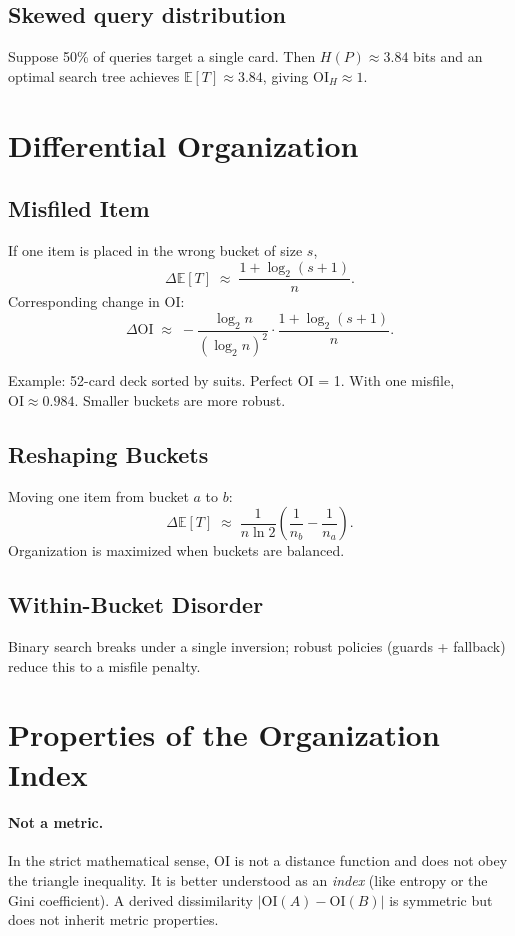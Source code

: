 \documentclass[11pt]{article}
\begin{document}
\subsection{Skewed query distribution}
Suppose 50\% of queries target a single card. Then
$H(P)\approx 3.84$ bits and an optimal search tree achieves
$\mathbb{E}[T]\approx 3.84$, giving $\mathrm{OI}_H\approx 1$.

\section{Differential Organization}
\subsection{Misfiled Item}
If one item is placed in the wrong bucket of size $s$,
\[
\Delta \mathbb{E}[T] \;\approx\; \frac{1+\log_2(s+1)}{n}.
\]
Corresponding change in OI:
\[
\Delta \mathrm{OI} \;\approx\;
-\frac{\log_2 n}{(\log_2 n)^2}\cdot \frac{1+\log_2(s+1)}{n}.
\]

Example: 52-card deck sorted by suits. Perfect OI = 1. With one misfile,
$\mathrm{OI} \approx 0.984$. Smaller buckets are more robust.

\subsection{Reshaping Buckets}
Moving one item from bucket $a$ to $b$:
\[
\Delta \mathbb{E}[T] \;\approx\; \frac{1}{n\ln 2}
\left(\frac{1}{n_b} - \frac{1}{n_a}\right).
\]
Organization is maximized when buckets are balanced.

\subsection{Within-Bucket Disorder}
Binary search breaks under a single inversion; robust policies (guards +
fallback) reduce this to a misfile penalty.

\section{Properties of the Organization Index}
\paragraph{Not a metric.}
In the strict mathematical sense, $\mathrm{OI}$ is not a distance function and
does not obey the triangle inequality. It is better understood as an \emph{index}
(like entropy or the Gini coefficient). A derived dissimilarity
$|\mathrm{OI}(A)-\mathrm{OI}(B)|$ is symmetric but does not inherit metric
properties.
\end{document}
